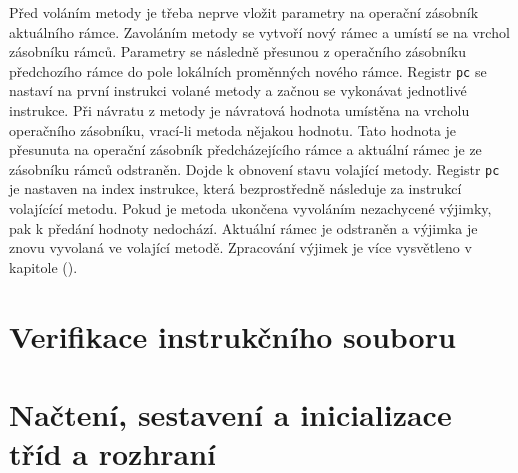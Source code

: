 Před voláním metody je třeba neprve vložit parametry na operační zásobník aktuálního rámce. Zavoláním metody se vytvoří nový rámec a umístí se na vrchol zásobníku rámců. Parametry se následně přesunou z operačního zásobníku předchozího rámce do pole lokálních proměnných nového rámce. Registr \texttt{pc} se nastaví na první instrukci volané metody a začnou se vykonávat jednotlivé instrukce. Při návratu z metody je návratová hodnota umístěna na vrcholu operačního zásobníku, vrací-li metoda nějakou hodnotu. Tato hodnota je přesunuta na operační zásobník předcházejícího rámce a aktuální rámec je ze zásobníku rámců odstraněn. Dojde k obnovení stavu volající metody. Registr \texttt{pc} je nastaven na index instrukce, která bezprostředně následuje za instrukcí volajícící metodu. Pokud je metoda ukončena vyvoláním nezachycené výjimky, pak k předání hodnoty nedochází. Aktuální rámec je odstraněn a výjimka je znovu vyvolaná ve volající metodě. Zpracování výjimek je více vysvětleno v kapitole ().


\section{Verifikace instrukčního souboru}


\section{Načtení, sestavení a inicializace tříd a rozhraní}



